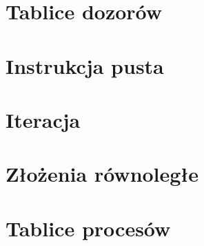 \documentclass[12pt,a4paper]{article}
\begin{document}
  \section{Tablice dozorów}

  \section{Instrukcja pusta}

  \section{Iteracja}

  \section{Złożenia równoległe}

  \section{Tablice procesów}
\end{document}
